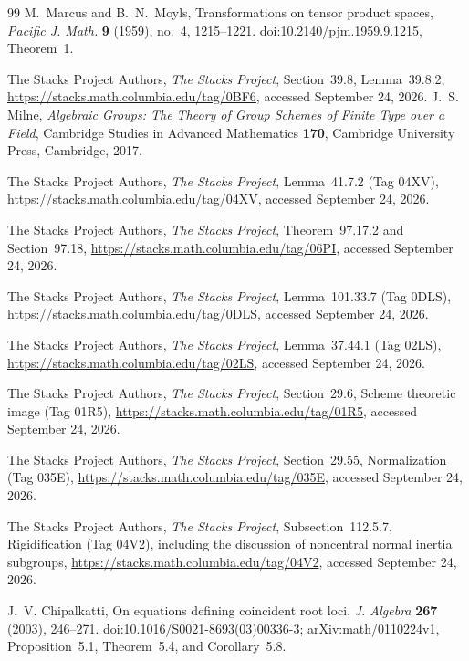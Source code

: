 \documentclass[11pt,reqno]{amsart}
\numberwithin{equation}{section}
\theoremstyle{definition}\newtheorem{definition}[theorem]{Definition}
\theoremstyle{remark}\newtheorem{remark}[theorem]{Remark}
\begin{document}
\begin{thebibliography}{99}
M.~Marcus and B.~N.~Moyls,
Transformations on tensor product spaces,
\emph{Pacific J. Math.} \textbf{9} (1959), no.~4, 1215--1221.
doi:10.2140/pjm.1959.9.1215, Theorem~1.

The Stacks Project Authors,
\emph{The Stacks Project}, Section~39.8, Lemma~39.8.2,
\url{https://stacks.math.columbia.edu/tag/0BF6}, accessed September 24, 2026.
J.~S. Milne, \emph{Algebraic Groups: The Theory of Group Schemes of
Finite Type over a Field}, Cambridge Studies in Advanced Mathematics
\textbf{170}, Cambridge University Press, Cambridge, 2017.

The Stacks Project Authors, \emph{The Stacks Project},
Lemma~41.7.2 (Tag 04XV),
\url{https://stacks.math.columbia.edu/tag/04XV}, accessed September 24, 2026.

The Stacks Project Authors, \emph{The Stacks Project},
Theorem~97.17.2 and Section~97.18,
\url{https://stacks.math.columbia.edu/tag/06PI}, accessed September 24, 2026.

The Stacks Project Authors, \emph{The Stacks Project},
Lemma~101.33.7 (Tag 0DLS),
\url{https://stacks.math.columbia.edu/tag/0DLS}, accessed September 24, 2026.

The Stacks Project Authors, \emph{The Stacks Project},
Lemma~37.44.1 (Tag 02LS),
\url{https://stacks.math.columbia.edu/tag/02LS}, accessed September 24, 2026.

The Stacks Project Authors, \emph{The Stacks Project},
Section~29.6, Scheme theoretic image (Tag 01R5),
\url{https://stacks.math.columbia.edu/tag/01R5}, accessed September 24, 2026.

The Stacks Project Authors, \emph{The Stacks Project},
Section~29.55, Normalization (Tag 035E),
\url{https://stacks.math.columbia.edu/tag/035E}, accessed September 24, 2026.

The Stacks Project Authors, \emph{The Stacks Project},
Subsection~112.5.7, Rigidification (Tag 04V2), including the discussion
of noncentral normal inertia subgroups,
\url{https://stacks.math.columbia.edu/tag/04V2}, accessed September 24, 2026.


J.~V. Chipalkatti, On equations defining coincident root loci,
\emph{J. Algebra} \textbf{267} (2003), 246--271.
doi:10.1016/S0021-8693(03)00336-3;
arXiv:math/0110224v1, Proposition~5.1, Theorem~5.4,
and Corollary~5.8.


\end{thebibliography}
\end{document}
